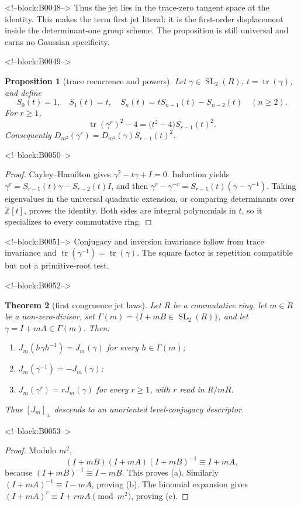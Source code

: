 \documentclass[11pt,a4paper]{article}
\newtheorem{theorem}{Theorem}[section]
\newtheorem{proposition}[theorem]{Proposition}
\theoremstyle{definition}
\theoremstyle{remark}
\newcommand{\SL}{\operatorname{SL}}
\newcommand{\tr}{\operatorname{tr}}
\begin{document}
<!--block:B0048-->
Thus the jet lies in the trace-zero tangent space at the identity. This makes the term first jet literal: it is the first-order displacement inside the determinant-one group scheme. The proposition is still universal and earns no Gaussian specificity.

<!--block:B0049-->
\begin{proposition}[trace recurrence and powers]\label{prop:powerdisc}
Let \(\gamma\in\SL_2(R)\), \(t=\tr(\gamma)\), and define
\[
 S_0(t)=1,\quad S_1(t)=t,\quad
 S_n(t)=tS_{n-1}(t)-S_{n-2}(t)\quad(n\ge2).
\]
For \(r\ge1\),
\[
 \tr(\gamma^r)^2-4=\bigl(t^2-4\bigr)S_{r-1}(t)^2.
\]
Consequently \(D_{m^2}(\gamma^r)=D_{m^2}(\gamma)S_{r-1}(t)^2\).
\end{proposition}

<!--block:B0050-->
\begin{proof}
Cayley--Hamilton gives \(\gamma^2-t\gamma+I=0\). Induction yields \(\gamma^r=S_{r-1}(t)\gamma-S_{r-2}(t)I\), and then
\(\gamma^r-\gamma^{-r}=S_{r-1}(t)(\gamma-\gamma^{-1})\).
Taking eigenvalues in the universal quadratic extension, or comparing determinants over \(\mathbb Z[t]\), proves the identity. Both sides are integral polynomials in \(t\), so it specializes to every commutative ring.
\end{proof}

<!--block:B0051-->
Conjugacy and inversion invariance follow from trace invariance and \(\tr(\gamma^{-1})=\tr(\gamma)\). The square factor is repetition compatible but not a primitive-root test.

<!--block:B0052-->
\begin{theorem}[first congruence jet laws]\label{thm:jet}
Let \(R\) be a commutative ring, let \(m\in R\) be a non-zero-divisor,
set \(\Gamma(m)=\{I+mB\in\SL_2(R)\}\), and let
\(\gamma=I+mA\in\Gamma(m)\). Then:
\begin{enumerate}[label=(\alph*)]
 \item \(J_m(h\gamma h^{-1})=J_m(\gamma)\) for every \(h\in\Gamma(m)\);
 \item \(J_m(\gamma^{-1})=-J_m(\gamma)\);
 \item \(J_m(\gamma^r)=rJ_m(\gamma)\) for every \(r\ge1\), with \(r\) read in \(R/mR\).
\end{enumerate}
Thus \([J_m]_{\pm}\) descends to an unoriented level-conjugacy descriptor.
\end{theorem}

<!--block:B0053-->
\begin{proof}
Modulo \(m^2\),
\[
 (I+mB)(I+mA)(I+mB)^{-1}\equiv I+mA,
\]
because \((I+mB)^{-1}\equiv I-mB\). This proves (a). Similarly \((I+mA)^{-1}\equiv I-mA\), proving (b). The binomial expansion gives \((I+mA)^r\equiv I+rmA\pmod{m^2}\), proving (c).
\end{proof}
\end{document}
